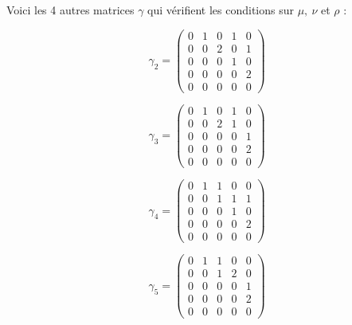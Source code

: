 \documentclass[12pt]{article}
\begin{document}
\newline
\newline
\vspace{1cm}
Voici les 4 autres matrices $\gamma$ qui vérifient les conditions sur $\mu,\:\nu$ et $\rho$ :\\
\begin{minipage}{.2\textwidth}%
  \[\gamma_2 = 
\begin{pmatrix}
0 & 1 & 0 & 1 & 0\\
0 & 0 & 2 & 0 & 1 \\
0 & 0 & 0 & 1 & 0 \\
0 & 0 & 0 & 0 & 2 \\
0 & 0 & 0 & 0 & 0
\end{pmatrix}\]
\end{minipage}%
\hfill
\begin{minipage}{1\textwidth}%
 \[\gamma_3 = 
\begin{pmatrix}
0 & 1 & 0 & 1 & 0\\
0 & 0 & 2 & 1 & 0 \\
0 & 0 & 0 & 0 & 1 \\
0 & 0 & 0 & 0 & 2 \\
0 & 0 & 0 & 0 & 0
\end{pmatrix}\]
\end{minipage}%
\newline
\newline
\begin{minipage}{.2\textwidth}%
 \[\gamma_4 = 
\begin{pmatrix}
0 & 1 & 1 & 0 & 0 \\
0 & 0 & 1 & 1 & 1 \\
0 & 0 & 0 & 1 & 0 \\
0 & 0 & 0 & 0 & 2 \\
0 & 0 & 0 & 0 & 0
\end{pmatrix}\]
\end{minipage}%
\hfill
\begin{minipage}{1\textwidth}%
 \[\gamma_5 = 
\begin{pmatrix}
0 & 1 & 1 & 0 & 0\\
0 & 0 & 1 & 2 &  0\\
0 & 0 & 0 & 0 & 1 \\
0 & 0 & 0 & 0 & 2 \\
0 & 0 & 0 & 0 & 0
\end{pmatrix}\]
\end{minipage}%
\newline
\newline
\end{document}
